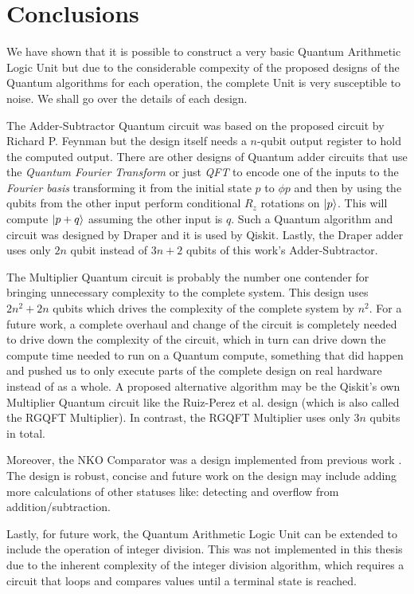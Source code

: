 \chapter{Conclusions}

We have shown that it is possible to construct a very basic Quantum Arithmetic Logic Unit but due to the considerable compexity of the proposed designs of
the Quantum algorithms for each operation, the complete Unit is very susceptible to noise. We shall go over the details of each design.

The Adder-Subtractor Quantum circuit was based on the proposed circuit by Richard P. Feynman \cite{Feynman1984} but the design itself needs a $n$-qubit
output register to hold the computed output. There are other designs of Quantum adder circuits that use the \textit{Quantum Fourier Transform} or just 
\textit{QFT} to encode one of the inputs to the \textit{Fourier basis} transforming it from the initial state $p$ to $\phi{p}$ and then by using the qubits
from the other input perform conditional $R_z$ rotations on $\ket{p}$. This will compute $\ket{p+q}$ assuming the other input is $q$. Such a Quantum algorithm
and circuit was designed by Draper \cite{Draper2000} and it is used by Qiskit. Lastly, the Draper adder uses only $2n$ qubit instead of $3n+2$ qubits of this work's
Adder-Subtractor.

The Multiplier Quantum circuit is probably the number one contender for bringing unnecessary complexity to the complete system. This design uses $2n^2+2n$ qubits
which drives the complexity of the complete system by $n^2$. For a future work, a complete overhaul and change of the circuit is completely needed to drive down
the complexity of the circuit, which in turn can drive down the compute time needed to run on a Quantum compute, something that did happen and pushed us to only execute
parts of the complete design on real hardware instead of as a whole. A proposed alternative algorithm may be the Qiskit's own Multiplier Quantum circuit like the
Ruiz-Perez et al. \cite{Ruiz_Perez_2017} design (which is also called the RGQFT Multiplier). In contrast, the RGQFT Multiplier uses only $3n$ qubits in total.

Moreover, the NKO Comparator was a design implemented from previous work \cite{NKO2006}. The design is robust, concise and future work on the design may include adding
more calculations of other statuses like: detecting and overflow from addition/subtraction.

Lastly, for future work, the Quantum Arithmetic Logic Unit can be extended to include the operation of integer
division. This was not implemented in this thesis due to the inherent complexity of the integer division algorithm\cite{Thapliyal2021},
which requires a circuit that loops and compares values until a terminal state is reached.